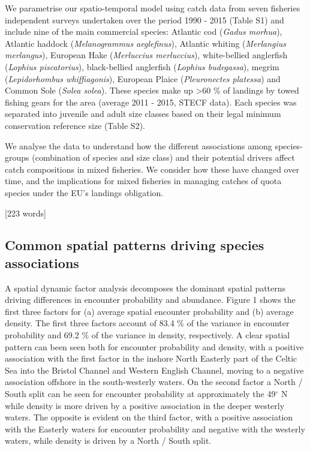 \documentclass{nature}
\begin{document}
\begin{linenumbers}
We parametrise our spatio-temporal model using catch data from seven fisheries
independent surveys undertaken over the period 1990 - 2015 (Table S1) and
include nine of the main commercial species: Atlantic cod (\textit{Gadus
	morhua}), Atlantic haddock (\textit{Melanogrammus aeglefinus}),
Atlantic whiting (\textit{Merlangius merlangus}), European Hake
(\textit{Merluccius merluccius}), white-bellied anglerfish (\textit{Lophius
	piscatorius}), black-bellied anglerfish (\textit{Lophius budegassa}),
megrim (\textit{Lepidorhombus whiffiagonis}), European Plaice
(\textit{Pleuronectes platessa}) and Common Sole (\textit{Solea solea}). These
species make up \textgreater 60 \% of landings by towed fishing gears for the
area (average 2011 - 2015, STECF data). Each species was separated into
juvenile and adult size classes based on their legal minimum conservation
reference size (Table S2).

We analyse the data to understand how the different associations among
species-groups (combination of species and size class) and their potential
drivers affect catch compositions in mixed fisheries. We consider how these
have changed over time, and the implications for mixed fisheries in managing
catches of quota species under the EU's landings obligation.

[223 words]

\subsection{Common spatial patterns driving species associations}
A spatial dynamic factor analysis decomposes the dominant spatial patterns
driving differences in encounter probability and abundance. Figure 1 shows the
first three factors for (a) average spatial encounter probability and (b)
average density. The first three factors account of 83.4 \% of the variance in
encounter probability and 69.2 \% of the variance in density, respectively. A
clear spatial pattern can been seen both for encounter probability and density,
with a positive association with the first factor in the inshore North Easterly
part of the Celtic Sea into the Bristol Channel and Western English Channel,
moving to a negative association offshore in the south-westerly waters. On the
second factor a North / South split can be seen for encounter probability at
approximately the 49$^{\circ}$ N while density is more driven by a positive
association in the deeper westerly waters.  The opposite is evident on the
third factor, with a positive association with the Easterly waters for
encounter probability and negative with the westerly waters, while density is
driven by a North / South split.


\end{linenumbers}
\end{document}
